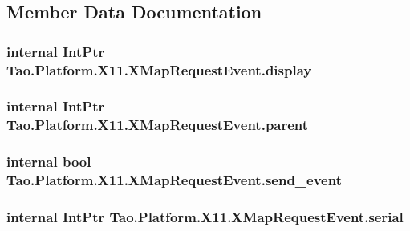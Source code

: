 \subsection{Member Data Documentation}
\hypertarget{struct_tao_1_1_platform_1_1_x11_1_1_x_map_request_event_a82baeee8cb3db5ce35d7b6f79d7c29f1}{
\subsubsection[{display}]{\setlength{\rightskip}{0pt plus 5cm}internal IntPtr {\bf Tao.Platform.X11.XMapRequestEvent.display}}}
\label{struct_tao_1_1_platform_1_1_x11_1_1_x_map_request_event_a82baeee8cb3db5ce35d7b6f79d7c29f1}
\hypertarget{struct_tao_1_1_platform_1_1_x11_1_1_x_map_request_event_aaac9b9383ab31b2f1154b7cea5b012a0}{
\subsubsection[{parent}]{\setlength{\rightskip}{0pt plus 5cm}internal IntPtr {\bf Tao.Platform.X11.XMapRequestEvent.parent}}}
\label{struct_tao_1_1_platform_1_1_x11_1_1_x_map_request_event_aaac9b9383ab31b2f1154b7cea5b012a0}
\hypertarget{struct_tao_1_1_platform_1_1_x11_1_1_x_map_request_event_a1c453d1fe2c78a2aca19a66d558dab8c}{
\subsubsection[{send\_\-event}]{\setlength{\rightskip}{0pt plus 5cm}internal bool {\bf Tao.Platform.X11.XMapRequestEvent.send\_\-event}}}
\label{struct_tao_1_1_platform_1_1_x11_1_1_x_map_request_event_a1c453d1fe2c78a2aca19a66d558dab8c}
\hypertarget{struct_tao_1_1_platform_1_1_x11_1_1_x_map_request_event_afc68c0f280edbd3f36b705b740fbc1af}{
\subsubsection[{serial}]{\setlength{\rightskip}{0pt plus 5cm}internal IntPtr {\bf Tao.Platform.X11.XMapRequestEvent.serial}}}
